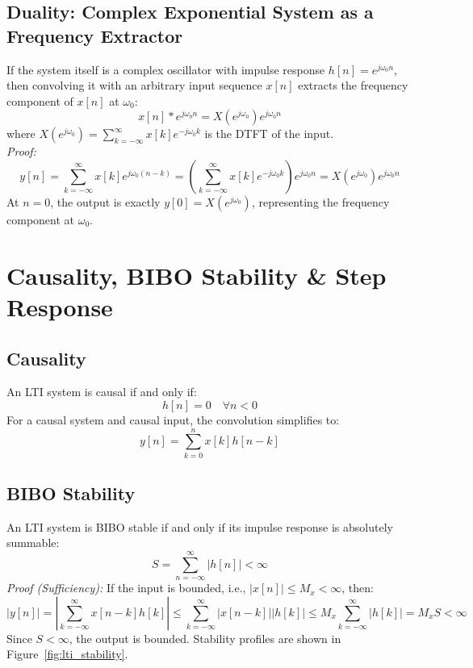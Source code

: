 \documentclass[11pt,a4paper]{article}
\begin{document}
\subsection{Duality: Complex Exponential System as a Frequency Extractor}
If the system itself is a complex oscillator with impulse response $h[n] = e^{j\omega_0 n}$, then convolving it with an arbitrary input sequence $x[n]$ extracts the frequency component of $x[n]$ at $\omega_0$:
\begin{equation}
x[n] * e^{j\omega_0 n} = X(e^{j\omega_0}) e^{j\omega_0 n}
\end{equation}
where $X(e^{j\omega_0}) = \sum_{k=-\infty}^{\infty} x[k] e^{-j\omega_0 k}$ is the DTFT of the input.
\\
\textit{Proof:}
\begin{equation}
y[n] = \sum_{k=-\infty}^{\infty} x[k] e^{j\omega_0(n-k)} = \left( \sum_{k=-\infty}^{\infty} x[k] e^{-j\omega_0 k} \right) e^{j\omega_0 n} = X(e^{j\omega_0}) e^{j\omega_0 n}
\end{equation}
At $n=0$, the output is exactly $y[0] = X(e^{j\omega_0})$, representing the frequency component at $\omega_0$.

\section{Causality, BIBO Stability \& Step Response}
\subsection{Causality}
An LTI system is causal if and only if:
\begin{equation}
h[n] = 0 \quad \forall n < 0
\end{equation}
For a causal system and causal input, the convolution simplifies to:
\begin{equation}
y[n] = \sum_{k=0}^{n} x[k] h[n-k]
\end{equation}

\subsection{BIBO Stability}
An LTI system is BIBO stable if and only if its impulse response is absolutely summable:
\begin{equation}
S = \sum_{n=-\infty}^{\infty} |h[n]| < \infty
\end{equation}
\textit{Proof (Sufficiency):} If the input is bounded, i.e., $|x[n]| \le M_x < \infty$, then:
\begin{equation}
|y[n]| = \left| \sum_{k=-\infty}^{\infty} x[n-k] h[k] \right| \le \sum_{k=-\infty}^{\infty} |x[n-k]| |h[k]| \le M_x \sum_{k=-\infty}^{\infty} |h[k]| = M_x S < \infty
\end{equation}
Since $S < \infty$, the output is bounded. Stability profiles are shown in Figure~\ref{fig:lti_stability}.
\end{document}
